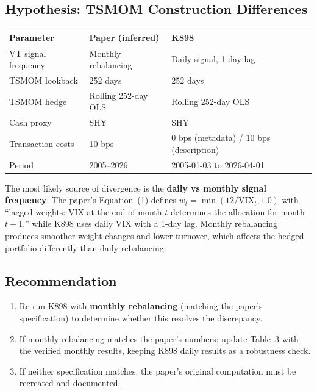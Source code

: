 \documentclass[12pt,a4paper]{article}
\begin{document}
\subsection{Hypothesis: TSMOM Construction Differences}

\begin{center}
\small
\begin{tabular}{lll}
\toprule
Parameter & Paper (inferred) & K898 \\
\midrule
VT signal frequency & Monthly rebalancing & Daily signal, 1-day lag \\
TSMOM lookback & 252 days & 252 days \\
TSMOM hedge & Rolling 252-day OLS & Rolling 252-day OLS \\
Cash proxy & SHY & SHY \\
Transaction costs & 10 bps & 0 bps (metadata) / 10 bps (description) \\
Period & 2005--2026 & 2005-01-03 to 2026-04-01 \\
\bottomrule
\end{tabular}
\end{center}

The most likely source of divergence is the \textbf{daily vs monthly signal frequency}. The paper's Equation~(1) defines $w_t = \min(12/\text{VIX}_t, 1.0)$ with ``lagged weights: VIX at the end of month $t$ determines the allocation for month $t+1$,'' while K898 uses daily VIX with a 1-day lag. Monthly rebalancing produces smoother weight changes and lower turnover, which affects the hedged portfolio differently than daily rebalancing.

\subsection{Recommendation}

\begin{enumerate}[nosep]
\item Re-run K898 with \textbf{monthly rebalancing} (matching the paper's specification) to determine whether this resolves the discrepancy.
\item If monthly rebalancing matches the paper's numbers: update Table~3 with the verified monthly results, keeping K898 daily results as a robustness check.
\item If neither specification matches: the paper's original computation must be recreated and documented.
\end{enumerate}


\end{document}
